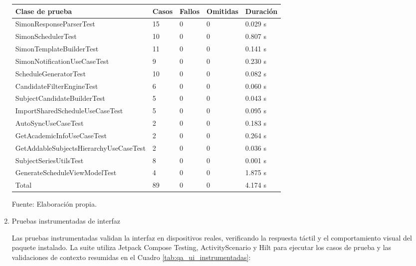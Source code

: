 \begin{enumerate}
\begin{center}
\begin{minipage}{\linewidth}
\centering
\begin{tabularx}{\linewidth}{@{}>{\RaggedRight\arraybackslash}X p{1.5cm}p{1.5cm}p{1.6cm}p{1.8cm}@{}}
\toprule
Clase de prueba & Casos & Fallos & Omitidas & Duración \\
\midrule
SimonResponseParserTest & 15 & 0 & 0 & 0.029 s \\
SimonSchedulerTest & 10 & 0 & 0 & 0.807 s \\
SimonTemplateBuilderTest & 11 & 0 & 0 & 0.141 s \\
SimonNotificationUseCaseTest & 9 & 0 & 0 & 0.230 s \\
ScheduleGeneratorTest & 10 & 0 & 0 & 0.082 s \\
CandidateFilterEngineTest & 6 & 0 & 0 & 0.060 s \\
SubjectCandidateBuilderTest & 5 & 0 & 0 & 0.043 s \\
ImportSharedScheduleUseCaseTest & 5 & 0 & 0 & 0.095 s \\
AutoSyncUseCaseTest & 2 & 0 & 0 & 0.183 s \\
GetAcademicInfoUseCaseTest & 2 & 0 & 0 & 0.264 s \\
GetAddableSubjectsHierarchyUseCaseTest & 2 & 0 & 0 & 0.036 s \\
SubjectSeriesUtilsTest & 8 & 0 & 0 & 0.001 s \\
GenerateScheduleViewModelTest & 4 & 0 & 0 & 1.875 s \\
Total & 89 & 0 & 0 & 4.174 s \\
\bottomrule
\end{tabularx}
\label{tab:qa_unitarias_resultado}
Fuente: Elaboración propia.
\end{minipage}
\end{center}

  \item Pruebas instrumentadas de interfaz

Las pruebas instrumentadas validan la interfaz en dispositivos reales, verificando la respuesta táctil y el comportamiento visual del paquete instalado. La suite utiliza Jetpack Compose Testing, ActivityScenario y Hilt para ejecutar los casos de prueba y las validaciones de contexto resumidas en el Cuadro \ref{tab:qa_ui_instrumentadas}:


\end{enumerate}
